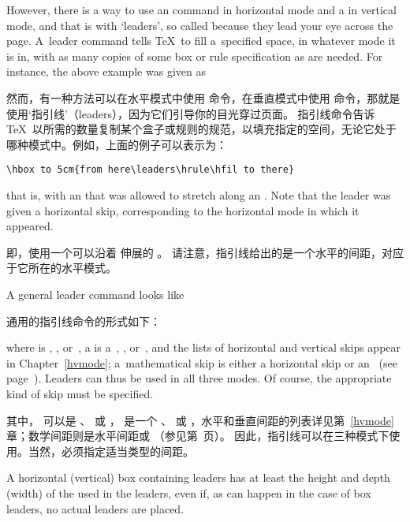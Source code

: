However, there is a way to use an  command in
horizontal mode and a  in vertical mode,
and that is with `leaders', so called because
they lead your eye across the page. 
A~leader command tells \TeX\
to fill a~specified space, in whatever mode it is in,
with as many copies of some box or rule specification
as are needed. For instance, the above example
was given as

然而，有一种方法可以在水平模式中使用  命令，在垂直模式中使用  命令，那就是使用`指引线'（leaders），因为它们引导你的目光穿过页面。
指引线命令告诉 \TeX\ 以所需的数量复制某个盒子或规则的规范，以填充指定的空间，无论它处于哪种模式中。例如，上面的例子可以表示为：

\begin{disp}\verb>\hbox to 5cm{from here\leaders\hrule\hfil to there}>\end{disp}
that is, with an \cs{hrule} that was allowed to stretch along
an .
Note that the leader was given a horizontal skip,
corresponding to the horizontal mode in which it appeared.

即，使用一个可以沿着  伸展的 。
请注意，指引线给出的是一个水平的间距，对应于它所在的水平模式。

A general leader command looks like

通用的指引线命令的形式如下：
\begin{Disp} %
      \end{Disp}
where \gr{leaders} is , , 
or~, a 
is a~, , or~, and the
lists of horizontal and vertical skips appear in Chapter~\ref{hvmode};
a~mathematical skip is either a horizontal skip or an~\cs{mskip}
(see page~\pageref{muglue}).
Leaders can thus be used in all three modes. Of course, the
appropriate kind of skip must be specified. 

其中， 可以是 、 或 ， 是一个 、 或 ，水平和垂直间距的列表详见第~\ref{hvmode}章；数学间距则是水平间距或 （参见第\pageref{muglue}~页）。
因此，指引线可以在三种模式下使用。当然，必须指定适当类型的间距。

A horizontal (vertical) box containing leaders has at least
the height and depth (width) of the  used
in the leaders, even if, as can happen in the case of box leaders,
no actual leaders are placed.

